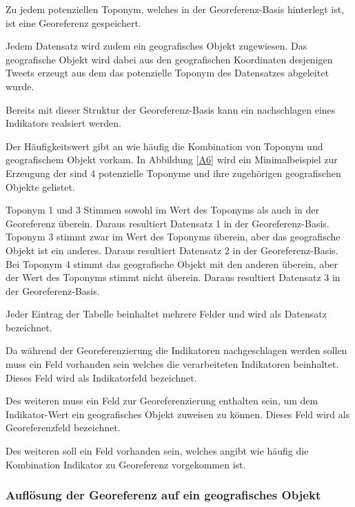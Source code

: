 					Zu jedem potenziellen Toponym, welches in der Georeferenz-Basis hinterlegt ist, ist eine Georeferenz gespeichert.

					
					
					Jedem Datensatz wird zudem ein geografisches Objekt zugewiesen.
					Das geografische Objekt wird dabei aus den geografischen Koordinaten desjenigen Tweets erzeugt aus dem das potenzielle Toponym des Datensatzes abgeleitet wurde.

					Bereits mit dieser Struktur der Georeferenz-Basis kann ein nachschlagen eines Indikators realsiert werden. 


					Der Häufigkeitswert gibt an wie häufig die Kombination von Toponym und geografischem Objekt vorkam. 
					In Abbildung \ref{A6} wird ein Minimalbeispiel zur Erzeugung der 
					sind 4 potenzielle Toponyme und ihre zugehörigen geografischen Objekte gelistet.
					
					Toponym 1 und 3 Stimmen sowohl im Wert des Toponyms als auch in der Georeferenz überein. 
					Daraus resultiert Datensatz 1 in der Georeferenz-Basis. 
					Toponym 3 stimmt zwar im Wert des Toponyms überein, aber das geografische Objekt ist ein anderes. 
					Daraus resultiert Datensatz 2 in der Georeferenz-Basis.
					Bei Toponym 4 stimmt das geografische Objekt mit den anderen überein, aber der Wert des Toponyms stimmt nicht überein.
					Daraus resultiert Datensatz 3 in der Georeferenz-Basis.


					Jeder Eintrag der Tabelle beinhaltet mehrere Felder und wird als Datensatz bezeichnet.

					Da während der Georeferenzierung die Indikatoren nachgeschlagen werden sollen muss ein Feld vorhanden sein welches die verarbeiteten Indikatoren beinhaltet.
					Dieses Feld wird als Indikatorfeld bezeichnet. 

					Des weiteren muss ein Feld zur Georeferenzierung enthalten sein, um dem Indikator-Wert ein geografisches Objekt zuweisen zu können. 
					Dieses Feld wird als Georeferenzfeld bezeichnet. 

					Des weiteren soll ein Feld vorhanden sein, welches angibt wie häufig die Kombination Indikator zu Georeferenz vorgekommen ist. 


				\subsubsection{Auflösung der Georeferenz auf ein geografisches Objekt}




